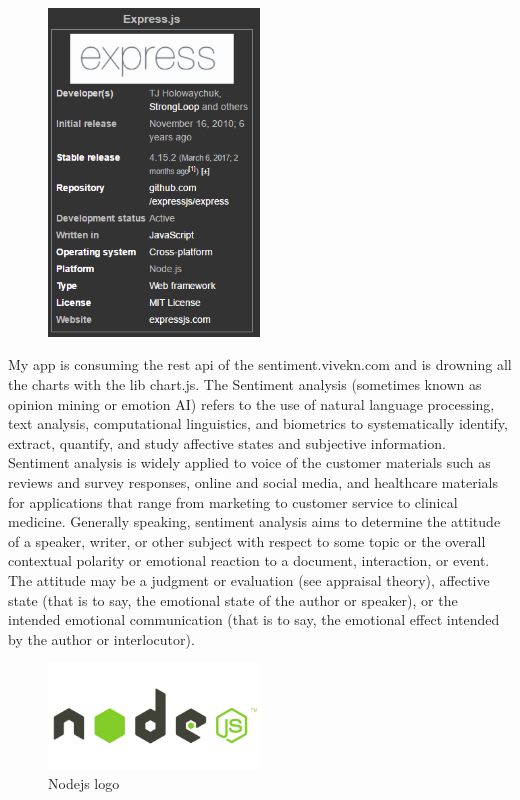 \begin{figure}[h]
	\centering
	\includegraphics[width=0.5\textwidth]{images/expressjs.png}
\end{figure}
My app is consuming the rest api of the sentiment.vivekn.com and is drowning all the charts with the lib chart.js. The Sentiment analysis (sometimes known as opinion mining or emotion AI) refers to the use of natural language processing, text analysis, computational linguistics, and biometrics to systematically identify, extract, quantify, and study affective states and subjective information. Sentiment analysis is widely applied to voice of the customer materials such as reviews and survey responses, online and social media, and healthcare materials for applications that range from marketing to customer service to clinical medicine.
Generally speaking, sentiment analysis aims to determine the attitude of a speaker, writer, or other subject with respect to some topic or the overall contextual polarity or emotional reaction to a document, interaction, or event. The attitude may be a judgment or evaluation (see appraisal theory), affective state (that is to say, the emotional state of the author or speaker), or the intended emotional communication (that is to say, the emotional effect intended by the author or interlocutor).
\begin{figure}[h]
	\caption{Nodejs logo}
	\centering
	\includegraphics[width=0.5\textwidth]{images/nodejs-logo.png}
\end{figure}

